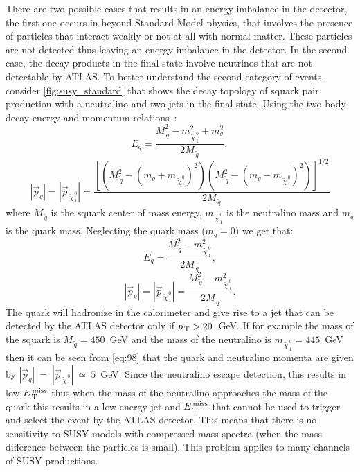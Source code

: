 There are two possible cases that results in an energy imbalance in the
detector, the first one occurs in beyond Standard Model physics, that involves
the presence of particles that interact weakly or not at all with normal
matter. These particles are not detected thus leaving an energy imbalance in the
detector. In the second case, the decay products in the final state involve
neutrinos that are not detectable by ATLAS\@. To better understand the second
category of events, consider \cref{fig:susy_standard} that shows the decay
topology of squark pair production with a neutralino and two jets in the final
state. Using the two body decay energy and momentum relations~\cite{PDG}:
\begin{equation}
  \label{eq:95}
  E_q = \frac{M_{\, \tilde{q}}^2 - m_{\, \tilde{\chi}_{\, 1}^{\, 0}}^2 + m_q^2}{2
    M_{\, \tilde{q}}},
\end{equation}
\begin{equation}
  \label{eq:96}
  |\vec{p}_q| = |\vec{p}_{\, \tilde{\chi}_{\, 1}^{\, 0}}| = \frac{\left[ \left(
        M_{\, \tilde{q}}^2 - (m_q + m_{\, \tilde{\chi}_{\, 1}^{\, 0}})^2
      \right) \left( M_{\, \tilde{q}}^2 - (m_q - m_{\, \tilde{\chi}_{\, 1}^{\,
            0}})^2 \right) \right]^{1/2}}{2 M_{\, \tilde{q}}}
\end{equation}
where $M_{\, \tilde{q}}$ is the squark center of mass energy,
$m_{\, \tilde{\chi}_{\, 1}^{\, 0}}$ is the neutralino mass and $m_q$ is the
quark mass. Neglecting the quark mass ($m_q = 0$) we get that:
\begin{equation}
  \label{eq:97}
  E_q = \frac{M_{\, \tilde{q}}^2 - m_{\, \tilde{\chi}_{\, 1}^{\, 0}}^2}{2 M_{\,
      \tilde{q}}},
\end{equation}
\begin{equation}
  \label{eq:98}
  |\vec{p}_q| = |\vec{p}_{\, \tilde{\chi}_{\, 1}^{\, 0}}| = \frac{M_{\,
      \tilde{q}}^2 - m_{\, \tilde{\chi}_{\, 1}^{\, 0}}^2}{2 M_{\, \tilde{q}}}.
\end{equation}
The quark will hadronize in the calorimeter and give rise to a jet that can be
detected by the ATLAS detector only if $p_\mathrm{\, T} > 20$~GeV. If for example the mass
of the squark is $M_{\, \tilde{q}} = 450$~GeV and the mass of the neutralino is
$m_{\, \tilde{\chi}_{\, 1}^{\, 0}} = 445$~GeV then it can be seen from
\cref{eq:98} that the quark and neutralino momenta are given by
$|\vec{p}_q|~=~|\vec{p}_{\, \tilde{\chi}_{\, 1}^{\, 0}}|~\simeq~5$~GeV. Since
the neutralino escape detection, this results in low $E_\mathrm{\, T}^\mathrm{\, miss}$ thus when the mass
of the neutralino approaches the mass of the quark this results in a low energy
jet and $E_\mathrm{\, T}^\mathrm{\, miss}$ that cannot be used to trigger and select the event by the ATLAS
detector. This means that there is no sensitivity to SUSY models with compressed
mass spectra (when the mass difference between the particles is small). This
problem applies to many channels of SUSY productions.

